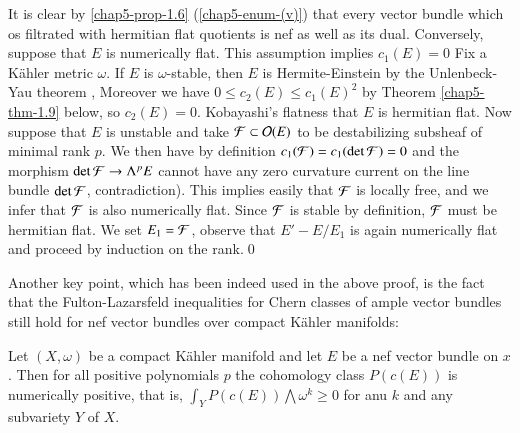 \begin{sketchofproof}
It is clear by \ref{chap5-prop-1.6} (\ref{chap5-enum-(v)}) that every vector bundle which os filtrated with hermitian flat quotients is nef as well as its dual. Conversely, suppose that $E$ is numerically flat. This assumption implies \break $c_{1}(E) = 0$ Fix a K\"ahler metric $\omega$. If $E$ is $\omega$-stable, then $E$ is Hermite-Einstein by the Unlenbeck-Yau theorem \cite{chap5-keyUY86}, Moreover we have $0 \leq c_{2}(E) \leq c_{1}(E)^{2}$ by Theorem \ref{chap5-thm-1.9} below, so $c_{2}(E) = 0$. Kobayashi's flatness that $E$ is hermitian flat. Now suppose that $E$ is unstable and take $\mathcal{F} \subset\mathcal{O}(E)$ to be destabilizing subsheaf of minimal rank $p$. We then have by definition $c_{1}(\mathcal{F}) = c_{1}(\det \mathcal{F}) = 0$ and the morphism $\det\mathcal{F} \rightarrow \Lambda^{p}E$ cannot have any zero curvature current on the line bundle $\det \mathcal{F}$, contradiction). This implies easily that $\mathcal{F}$ is locally free, and we infer that $\mathcal{F}$ is also numerically flat. Since $\mathcal{F}$ is stable by definition, $\mathcal{F}$ must be hermitian flat. We set $E_{1} = \mathcal{F}$, observe that $E' - E/E_{1}$ is again numerically flat and proceed by induction on the rank.\hfill\qed
\end{sketchofproof}

Another key point, which has been indeed used in the above proof, is the fact that the Fulton-Lazarsfeld inequalities \cite{chap5-keyFL83} for Chern classes of ample vector bundles still hold for nef vector bundles over compact K\"ahler manifolds:

\begin{secthm}\label{chap5-thm-1.9}
Let $(X, \omega)$ be a compact K\"ahler manifold and let $E$ be a nef vector bundle on $x$. Then for all positive polynomials $p$ the cohomology class $P(c(E))$ is numerically positive, that is, $\int_{Y}P(c(E)) \bigwedge \omega^{k} \geq 0$ for anu $k$ and any subvariety $Y$ of $X$.
\end{secthm}

